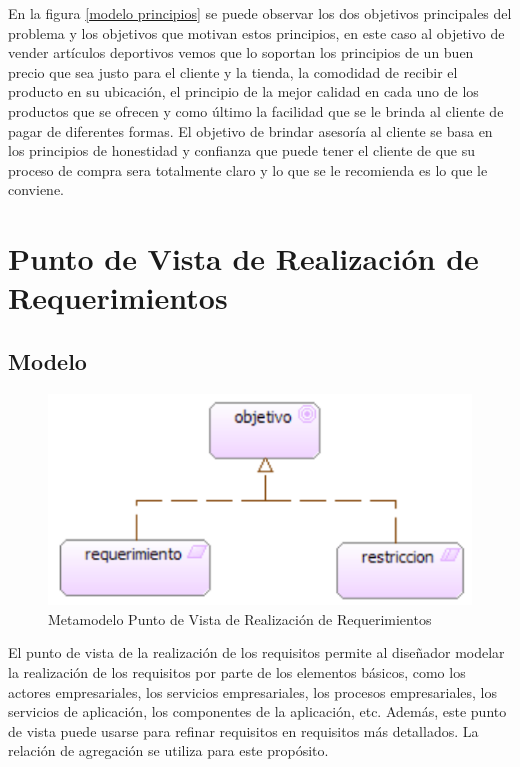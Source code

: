 En la figura \ref{modelo principios} se puede observar los dos objetivos principales del problema y los objetivos que motivan estos principios, en este caso al objetivo de vender artículos deportivos vemos que lo soportan los principios de un buen precio que sea justo para el cliente y la tienda, la comodidad de recibir el producto en su ubicación, el principio de la mejor calidad en cada uno de los productos que se ofrecen
 y como último la facilidad que se le brinda al cliente de pagar de diferentes formas.\newline
El objetivo de brindar asesoría al cliente se basa en los principios de honestidad y confianza que puede tener el cliente de que su proceso de compra sera totalmente claro y lo que se le recomienda es lo que le conviene.
\newpage

\section{Punto de Vista de Realización de Requerimientos}

\subsection{Modelo}

\begin{figure}[th!]
	\centering
	\includegraphics[width=0.7\linewidth]{arquitectura/imagenes/modeloRealizacionRequerimientos}
	\caption{Metamodelo Punto de Vista de Realización de Requerimientos}
	\label{metamodelo realizacion requerimientos}
\end{figure}
El punto de vista de la realización de los requisitos permite al diseñador modelar la realización de los requisitos por parte de los elementos básicos, como los actores empresariales, los servicios empresariales, los procesos empresariales, los servicios de aplicación, los componentes de la aplicación, etc.
Además, este punto de vista puede usarse para refinar requisitos en requisitos más detallados. La relación de agregación se utiliza para este propósito.

